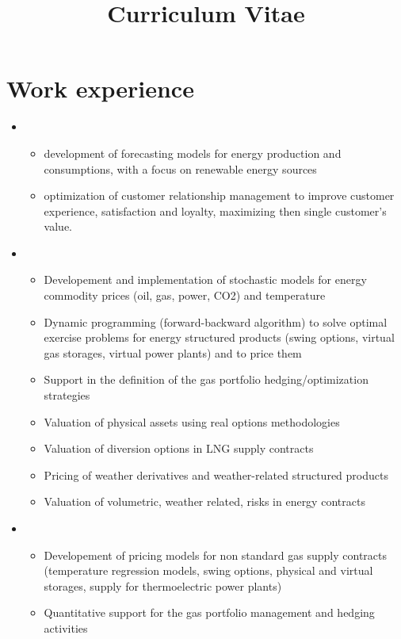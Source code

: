 \documentclass[11pt,a4paper,sans]{moderncv}        %
\title{Curriculum Vitae}                               %
\begin{document}
\makecvtitle

\section{Work experience}

\begin{itemize}
\item{}
\begin{itemize}
\item development of forecasting models for energy production and consumptions, with a focus on renewable energy sources
\item optimization of customer relationship management to improve customer experience, satisfaction and loyalty, maximizing then single customer's value.
\end{itemize}

\item{}
\begin{itemize}
\item {Developement and implementation of stochastic models for energy commodity prices (oil, gas, power, CO2) and temperature}
\item {Dynamic programming (forward-backward algorithm) to solve optimal exercise problems for energy structured products (swing options, virtual gas storages, virtual power plants) and to price them}
\item {Support in the definition of the gas portfolio hedging/optimization strategies}
\item {Valuation of physical assets using real options methodologies}
\item {Valuation of diversion options in LNG supply contracts}
\item {Pricing of weather derivatives and weather-related structured products}
\item {Valuation of volumetric, weather related, risks in energy contracts}
\end{itemize}
\item{
\begin{itemize}
\item {Developement of pricing models for non standard gas supply contracts (temperature regression models, swing options, physical and virtual storages, supply for thermoelectric power plants)}
\item {Quantitative support for the gas portfolio management and hedging activities}
\end{itemize}
}
\end{itemize}
\end{document}
